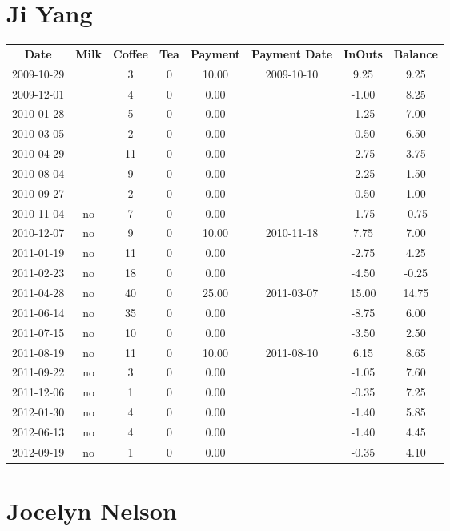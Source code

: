 \section{Ji Yang}

\begin{center}
\begin{tabular}{cccccccc}
\textbf{Date} & \textbf{Milk} & \textbf{Coffee} & \textbf{Tea} & \textbf{Payment} & \textbf{Payment Date} & \textbf{InOuts} & \textbf{Balance} \\
2009-10-29 &  &  3 & 0 & 10.00 & 2009-10-10 &  9.25 &  9.25\\ 
2009-12-01 &  &  4 & 0 &  0.00 &  & -1.00 &  8.25\\ 
2010-01-28 &  &  5 & 0 &  0.00 &  & -1.25 &  7.00\\ 
2010-03-05 &  &  2 & 0 &  0.00 &  & -0.50 &  6.50\\ 
2010-04-29 &  & 11 & 0 &  0.00 &  & -2.75 &  3.75\\ 
2010-08-04 &  &  9 & 0 &  0.00 &  & -2.25 &  1.50\\ 
2010-09-27 &  &  2 & 0 &  0.00 &  & -0.50 &  1.00\\ 
2010-11-04 & no &  7 & 0 &  0.00 &  & -1.75 & -0.75\\ 
2010-12-07 & no &  9 & 0 & 10.00 & 2010-11-18 &  7.75 &  7.00\\ 
2011-01-19 & no & 11 & 0 &  0.00 &  & -2.75 &  4.25\\ 
2011-02-23 & no & 18 & 0 &  0.00 &  & -4.50 & -0.25\\ 
2011-04-28 & no & 40 & 0 & 25.00 & 2011-03-07 & 15.00 & 14.75\\ 
2011-06-14 & no & 35 & 0 &  0.00 &  & -8.75 &  6.00\\ 
2011-07-15 & no & 10 & 0 &  0.00 &  & -3.50 &  2.50\\ 
2011-08-19 & no & 11 & 0 & 10.00 & 2011-08-10 &  6.15 &  8.65\\ 
2011-09-22 & no &  3 & 0 &  0.00 &  & -1.05 &  7.60\\ 
2011-12-06 & no &  1 & 0 &  0.00 &  & -0.35 &  7.25\\ 
2012-01-30 & no &  4 & 0 &  0.00 &  & -1.40 &  5.85\\ 
2012-06-13 & no &  4 & 0 &  0.00 &  & -1.40 &  4.45\\ 
2012-09-19 & no &  1 & 0 &  0.00 &  & -0.35 &  4.10
\end{tabular}
\end{center}

\section{Jocelyn Nelson}


